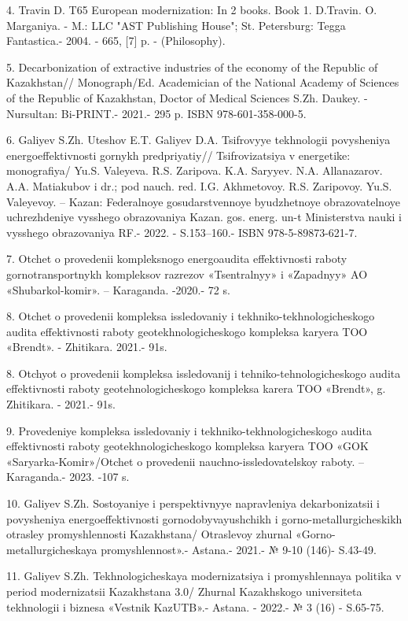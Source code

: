 4. Travin D. T65 European modernization: In 2 books. Book 1. D.Travin.
O. Marganiya. - M.: LLC "AST Publishing House"; St. Petersburg: Tegga
Fantastica.- 2004. - 665, {[}7{]} p. - (Philosophy).

5. Decarbonization of extractive industries of the economy of the
Republic of Kazakhstan// Monograph/Ed. Academician of the National
Academy of Sciences of the Republic of Kazakhstan, Doctor of Medical
Sciences S.Zh. Daukey. - Nursultan: Bi-PRINT.- 2021.- 295 p. ISBN
978-601-358-000-5.

6. Galiyev S.Zh. Uteshov E.T. Galiyev D.A. Tsifrovyye tekhnologii
povysheniya energoeffektivnosti gornykh predpriyatiy// Tsifrovizatsiya v
energetike: monografiya/ Yu.S. Valeyeva. R.S. Zaripova. K.A. Saryyev.
N.A. Allanazarov. A.A. Matiakubov i dr.; pod nauch. red. I.G.
Akhmetovoy. R.S. Zaripovoy. Yu.S. Valeyevoy. -- Kazan: Federalnoye
gosudarstvennoye byudzhetnoye obrazovatelnoye uchrezhdeniye vysshego
obrazovaniya Kazan. gos. energ. un-t Ministerstva nauki i vysshego
obrazovaniya RF.- 2022. - S.153--160.- ISBN 978-5-89873-621-7.

7. Otchet o provedenii kompleksnogo energoaudita effektivnosti raboty
gornotransportnykh kompleksov razrezov «Tsentralnyy» i «Zapadnyy» AO
«Shubarkol-komir». -- Karaganda. -2020.- 72 s.

8. Otchet o provedenii kompleksa issledovaniy i
tekhniko-tekhnologicheskogo audita effektivnosti raboty
geotekhnologicheskogo kompleksa karyera TOO «Brendt». - Zhitikara.
2021.- 91s.

8. Otchyot o provedenii kompleksa issledovanij i
tehniko-tehnologicheskogo audita effektivnosti raboty
geotehnologicheskogo kompleksa karera TOO «Brendt», g. Zhitikara. -
2021.- 91s.

9. Provedeniye kompleksa issledovaniy i tekhniko-tekhnologicheskogo
audita effektivnosti raboty geotekhnologicheskogo kompleksa karyera TOO
«GOK «Saryarka-Komіr»/Otchet o provedenii nauchno-issledovatelskoy
raboty. -- Karaganda.- 2023. -107 s.

10. Galiyev S.Zh. Sostoyaniye i perspektivnyye napravleniya
dekarbonizatsii i povysheniya energoeffektivnosti gornodobyvayushchikh i
gorno-metallurgicheskikh otrasley promyshlennosti Kazakhstana/
Otraslevoy zhurnal «Gorno-metallurgicheskaya promyshlennost».- Astana.-
2021.- № 9-10 (146)- S.43-49.

11. Galiyev S.Zh. Tekhnologicheskaya modernizatsiya i promyshlennaya
politika v period modernizatsii Kazakhstana 3.0/ Zhurnal Kazakhskogo
universiteta tekhnologii i biznesa «Vestnik KazUTB».- Astana. - 2022.- №
3 (16) - S.65-75.

